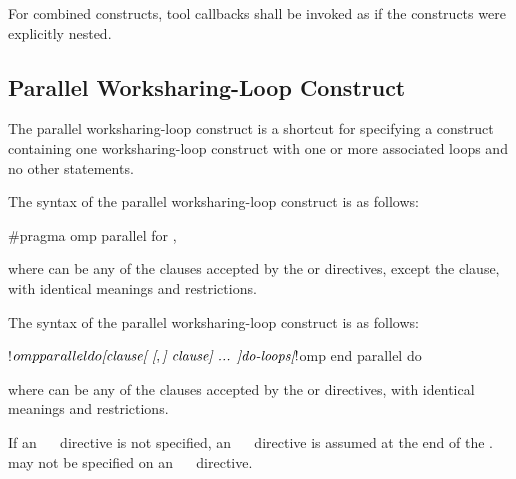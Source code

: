 For combined constructs, tool callbacks shall be invoked as if the constructs were
explicitly nested.






\subsection{Parallel Worksharing-Loop Construct}
\label{subsec:Parallel Worksharing-Loop Construct}
\summary
The parallel worksharing-loop construct is a shortcut for specifying a  construct
containing one worksharing-loop construct with one or more associated loops and no other statements.


\syntax
\begin{ccppspecific}
The syntax of the parallel worksharing-loop construct is as follows:

\begin{ompcPragma}
#pragma omp parallel for \plc{[clause[ [},\plc{] clause] ... ] new-line}
\end{ompcPragma}

where  can be any of the clauses accepted by the  or  directives,
except the  clause, with identical meanings and restrictions.
\end{ccppspecific}

\begin{fortranspecific}
The syntax of the parallel worksharing-loop construct is as follows:

\begin{ompfPragma}
!$omp parallel do \plc{[clause[ [},\plc{] clause] ... ]}
   \plc{do-loops}
\plc{[}!$omp end parallel do\plc{]}
\end{ompfPragma}

where  can be any of the clauses accepted by the  or  directives,
with identical meanings and restrictions.

If an ~~ directive is not specified, an ~~ directive is
assumed at the end of the .  may not be specified on an
~~ directive.
\end{fortranspecific}

